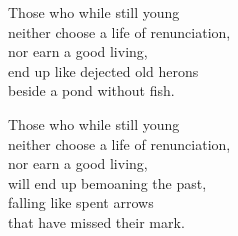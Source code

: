 Those who while still young\\
neither choose a life of renunciation,\\
nor earn a good living,\\
end up like dejected old herons\\
beside a pond without fish.


Those who while still young\\
neither choose a life of renunciation,\\
nor earn a good living,\\
will end up bemoaning the past,\\
falling like spent arrows\\
that have missed their mark.

